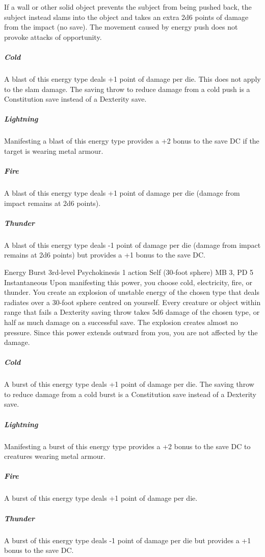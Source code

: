   If a wall or other solid object prevents the subject from being pushed back,
  the subject instead slams into the object and takes an extra
  2d6 points of damage from the impact (no save).
  The movement caused by energy push does not provoke attacks of opportunity.
  \subparagraph{Cold}
    A blast of this energy type deals +1 point of damage per die.
    This does not apply to the slam damage.
    The saving throw to reduce damage from a cold push
    is a Constitution save instead of a Dexterity save.
  \subparagraph{Lightning}
    Manifesting a blast of this energy type provides a +2 bonus
    to the save DC if the target is wearing metal armour.
  \subparagraph{Fire}
    A blast of this energy type deals +1 point of damage per die
    (damage from impact remains at 2d6 points).
  \subparagraph{Thunder}
    A blast of this energy type deals -1 point of damage per die
    (damage from impact remains at 2d6 points)
    but provides a +1 bonus to the save DC.

\DndPowerHeader%
  {Energy Burst}
  {3rd-level Psychokinesis}
  {1 action}
  {Self (30-foot sphere)}
  {MB 3, PD 5}
  {Instantaneous}
Upon manifesting this power, you choose cold, electricity,
fire, or thunder.
You create an explosion of unstable energy of the chosen type
that deals radiates over a 30-foot sphere
centred on yourself.
Every creature or object within range that fails a Dexterity saving throw
takes 5d6 damage of the chosen type, or
half as much damage on a successful save.
The explosion creates almost no pressure.
Since this power extends outward from you,
you are not affected by the damage.

  \subparagraph{Cold}
  A burst of this energy type deals +1 point of damage per die.
  The saving throw to reduce damage from a cold burst
  is a Constitution save instead of a Dexterity save.
  
  \subparagraph{Lightning}
  Manifesting a burst of this energy type provides a +2 bonus
  to the save DC to creatures wearing metal armour.
  
  \subparagraph{Fire}
  A burst of this energy type deals +1 point of damage per die.
  
  \subparagraph{Thunder}
    A burst of this energy type deals -1 point of damage per die
    but provides a +1 bonus to the save DC.

